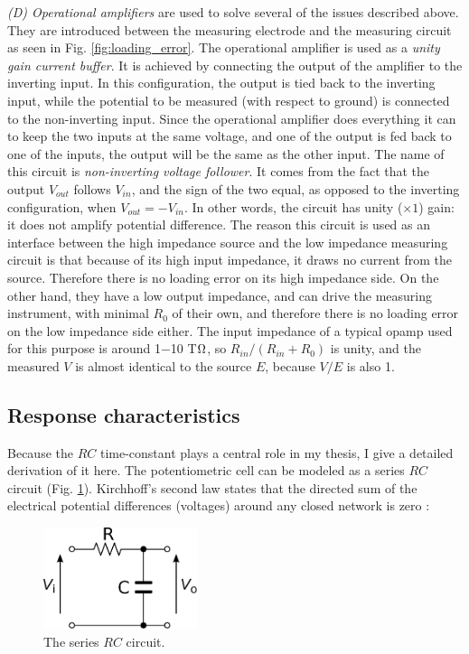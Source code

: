 \emph{(D) Operational amplifiers} are used to solve several of the issues described above.
They are introduced between the measuring electrode and the measuring circuit as seen in Fig. \ref{fig:loading_error}.
The operational amplifier is used as a \emph{unity gain current buffer}.
It is achieved by connecting the output of the amplifier to the inverting input.
In this configuration, the output is tied back to the inverting input, while the potential to be measured (with respect to ground) is connected to the non-inverting input.
Since the operational amplifier does everything it can to keep the two inputs at the same voltage, and one of the output is fed back to one of the inputs, the output will be the same as the other input.  
The name of this circuit is \emph{non-inverting voltage follower}.
It comes from the fact that the output $V_{out}$ follows $V_{in}$, and the sign of the two equal, as opposed to the inverting configuration, when $V_{out}=-V_{in}$.
In other words, the circuit has unity ($\times 1$) gain: it does not amplify potential difference.
The reason this circuit is used as an interface between the high impedance source and the low impedance measuring circuit is that because of its high input impedance, it draws no current from the source.
Therefore there is no loading error on its high impedance side.
On the other hand, they have a low output impedance, and can drive the measuring instrument, with minimal $R_0$ of their own, and therefore there is no loading error on the low impedance side either.
The input impedance of a typical opamp used for this purpose is around 1$-$10 T$\ohm$, so $R_{in}/(R_{in}+R_0)$ is unity, and the measured $V$ is almost identical to the source $E$, because $V/E$ is also 1.

		\subsection{Response characteristics}
Because the $RC$ time-constant plays a central role in my thesis, I give a detailed derivation of it here.
The potentiometric cell can be modeled as a series $RC$ circuit (Fig. \ref{fig:rc}).
Kirchhoff's second law states that the directed sum of the electrical potential differences (voltages) around any closed network is zero \cite{hill2015art}:

\begin{figure}
\centering
\includegraphics[width=0.4\textwidth]{img/theory/rc.eps}
\caption{The series $RC$ circuit.}
\label{fig:rc}
\end{figure}

